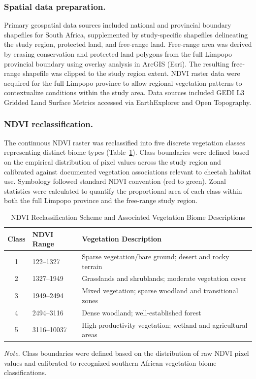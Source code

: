 \documentclass[12pt, letterpaper]{article}
\begin{document}
\subsubsection{Spatial data preparation.}
Primary geospatial data sources included national and provincial boundary shapefiles for South
Africa, supplemented by study-specific shapefiles delineating the study region, protected land,
and free-range land. Free-range area was derived by erasing conservation and protected land
polygons from the full Limpopo provincial boundary using overlay analysis in ArcGIS (Esri).
The resulting free-range shapefile was clipped to the study region extent. NDVI raster data
were acquired for the full Limpopo province to allow regional vegetation patterns to
contextualize conditions within the study area. Data sources included GEDI L3 Gridded Land
Surface Metrics accessed via EarthExplorer and Open Topography.

\subsubsection{NDVI reclassification.}
The continuous NDVI raster was reclassified into five discrete vegetation classes representing
distinct biome types (Table~\ref{tab:ndvi}). Class boundaries were defined based on the
empirical distribution of pixel values across the study region and calibrated against documented
vegetation associations relevant to cheetah habitat use. Symbology followed standard NDVI
convention (red to green). Zonal statistics were calculated to quantify the proportional area of
each class within both the full Limpopo province and the free-range study region.

\vspace{6pt}

\begin{table}[H]
\caption{NDVI Reclassification Scheme and Associated Vegetation Biome Descriptions}
\label{tab:ndvi}
\centering
\renewcommand{\arraystretch}{1.35}
\begin{tabularx}{\textwidth}{c l X}
\toprule
\textbf{Class} & \textbf{NDVI Range} & \textbf{Vegetation Description} \\
\midrule
1 & 122--1327   & Sparse vegetation/bare ground; desert and rocky terrain \\
2 & 1327--1949  & Grasslands and shrublands; moderate vegetation cover \\
3 & 1949--2494  & Mixed vegetation; sparse woodland and transitional zones \\
4 & 2494--3116  & Dense woodland; well-established forest \\
5 & 3116--10037 & High-productivity vegetation; wetland and agricultural areas \\
\bottomrule
\end{tabularx}
\vspace{4pt}
\noindent\footnotesize\textit{Note}. Class boundaries were defined based on the distribution of
raw NDVI pixel values and calibrated to recognized southern African vegetation biome
classifications.
\end{table}
\end{document}
